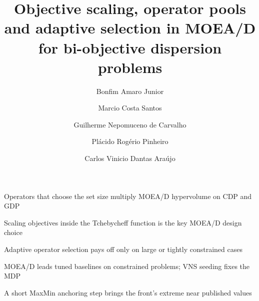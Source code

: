 \documentclass[final,3p,times,11pt,authoryear]{elsarticle}
\theoremstyle{plain}
\theoremstyle{definition}
\theoremstyle{remark}
\begin{document}
\begin{frontmatter}

\title{Objective scaling, operator pools and adaptive selection in MOEA/D for bi-objective dispersion problems}

\author[uece]{Bonfim Amaro Junior}
\author[ufmg]{Marcio Costa Santos}
\author[uece]{Guilherme Nepomuceno de Carvalho}
\author[unifor]{Plácido Rogério Pinheiro}
\author[uece]{Carlos Vinicio Dantas Araújo}


\begin{highlights}
\item Operators that choose the set size multiply MOEA/D hypervolume on CDP and GDP
\item Scaling objectives inside the Tchebycheff function is the key MOEA/D design choice
\item Adaptive operator selection pays off only on large or tightly constrained cases
\item MOEA/D leads tuned baselines on constrained problems; VNS seeding fixes the MDP
\item A short MaxMin anchoring step brings the front's extreme near published values
\end{highlights}


\end{frontmatter}
\end{document}
